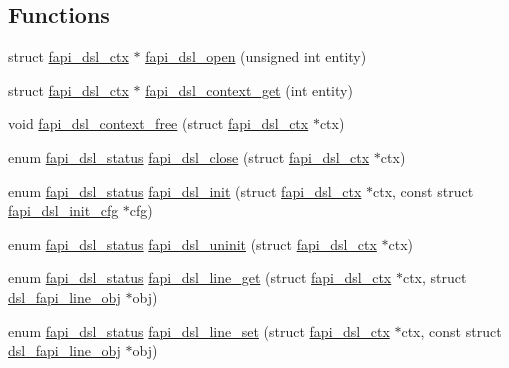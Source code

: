 \subsection*{Functions}
\begin{DoxyCompactItemize}
\item 
struct \hyperlink{structfapi__dsl__ctx}{fapi\-\_\-dsl\-\_\-ctx} $\ast$ \hyperlink{group__FAPI__DSL_ga97a5a099ffdeed990806cc76f87e1dd1}{fapi\-\_\-dsl\-\_\-open} (unsigned int entity)
\item 
struct \hyperlink{structfapi__dsl__ctx}{fapi\-\_\-dsl\-\_\-ctx} $\ast$ \hyperlink{group__FAPI__DSL_gafdf9b16c3deb7606d7ac9b1bd0e28b55}{fapi\-\_\-dsl\-\_\-context\-\_\-get} (int entity)
\item 
void \hyperlink{group__FAPI__DSL_ga1b948f298a5b6cadd7fb70f6094f8ce9}{fapi\-\_\-dsl\-\_\-context\-\_\-free} (struct \hyperlink{structfapi__dsl__ctx}{fapi\-\_\-dsl\-\_\-ctx} $\ast$ctx)
\item 
enum \hyperlink{group__FAPI__DSL_ga6a68d961535e6f7aa239751763131a70}{fapi\-\_\-dsl\-\_\-status} \hyperlink{group__FAPI__DSL_gaeb6ffcb5ef5d02e719b6479a15a3df4e}{fapi\-\_\-dsl\-\_\-close} (struct \hyperlink{structfapi__dsl__ctx}{fapi\-\_\-dsl\-\_\-ctx} $\ast$ctx)
\item 
enum \hyperlink{group__FAPI__DSL_ga6a68d961535e6f7aa239751763131a70}{fapi\-\_\-dsl\-\_\-status} \hyperlink{group__FAPI__DSL_gaabeecfee55120db4952c21aedf4126c6}{fapi\-\_\-dsl\-\_\-init} (struct \hyperlink{structfapi__dsl__ctx}{fapi\-\_\-dsl\-\_\-ctx} $\ast$ctx, const struct \hyperlink{structfapi__dsl__init__cfg}{fapi\-\_\-dsl\-\_\-init\-\_\-cfg} $\ast$cfg)
\item 
enum \hyperlink{group__FAPI__DSL_ga6a68d961535e6f7aa239751763131a70}{fapi\-\_\-dsl\-\_\-status} \hyperlink{group__FAPI__DSL_ga6db762b72c1f0d2c2d4144f517f7b46d}{fapi\-\_\-dsl\-\_\-uninit} (struct \hyperlink{structfapi__dsl__ctx}{fapi\-\_\-dsl\-\_\-ctx} $\ast$ctx)
\item 
enum \hyperlink{group__FAPI__DSL_ga6a68d961535e6f7aa239751763131a70}{fapi\-\_\-dsl\-\_\-status} \hyperlink{group__FAPI__DSL_ga18621a794c8d271291a7eb9dc7f593bb}{fapi\-\_\-dsl\-\_\-line\-\_\-get} (struct \hyperlink{structfapi__dsl__ctx}{fapi\-\_\-dsl\-\_\-ctx} $\ast$ctx, struct \hyperlink{structdsl__fapi__line__obj}{dsl\-\_\-fapi\-\_\-line\-\_\-obj} $\ast$obj)
\item 
enum \hyperlink{group__FAPI__DSL_ga6a68d961535e6f7aa239751763131a70}{fapi\-\_\-dsl\-\_\-status} \hyperlink{group__FAPI__DSL_ga3a38e7977ea6636741d1bf5f7c5a1bf1}{fapi\-\_\-dsl\-\_\-line\-\_\-set} (struct \hyperlink{structfapi__dsl__ctx}{fapi\-\_\-dsl\-\_\-ctx} $\ast$ctx, const struct \hyperlink{structdsl__fapi__line__obj}{dsl\-\_\-fapi\-\_\-line\-\_\-obj} $\ast$obj)

\end{DoxyCompactItemize}
